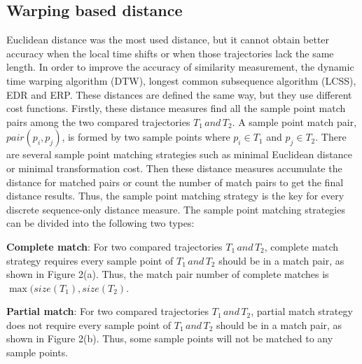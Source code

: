 \documentclass[a4paper, 12pt]{article}
\begin{document}
\subsection{Warping based distance}
Euclidean distance was the most used distance, but it cannot obtain better accuracy when the local time shifts or when those trajectories lack the same length. In order to improve the accuracy of similarity measurement, the dynamic time warping algorithm (DTW), longest common subsequence algorithm (LCSS), EDR and ERP. These distances are defined the same way, but they use different cost functions. Firstly, these distance measures find all the sample point match pairs among the two compared trajectories $T_{1}\,and\,T_{2}$. A sample point match pair, $pair(p_{i},p_{j})$, is formed by two sample points where $p_{i} \in T_{1}$ and $p_{j} \in T_{2}$. There are several sample point matching strategies such as minimal Euclidean distance or minimal transformation cost. Then these distance measures accumulate the distance for matched pairs or count the number of match pairs to get the final distance results. Thus, the sample point matching strategy is the key for every discrete sequence-only distance measure. The sample point matching strategies can be divided into the following two types:

\textbf{Complete match}: For two compared trajectories $T_{1}\,and\,T_{2}$, complete match strategy requires every sample point of $T_{1}\,and\,T_{2}$ should be in a match pair, as shown in Figure 2(a). Thus, the match pair number of complete matches is $\max(size(T_{1}),size(T_{2})$.

\textbf{Partial match}: For two compared trajectories $T_{1}\,and\,T_{2}$, partial match strategy does not require every sample point of $T_{1}\,and\,T_{2}$ should be in a match pair, as shown in Figure 2(b). Thus, some sample points will not be matched to any sample points.
\end{document}
